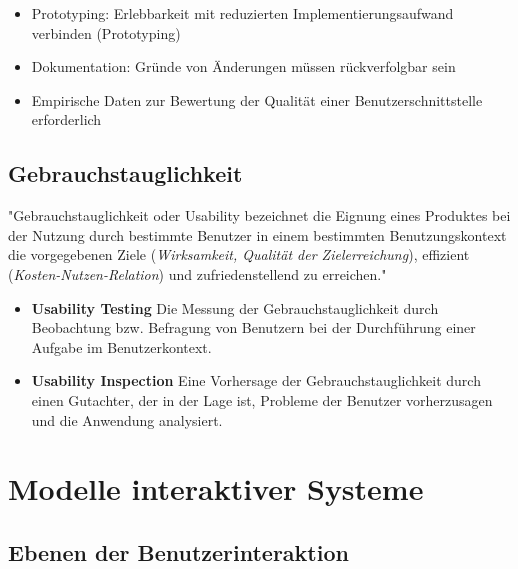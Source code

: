 \documentclass
[
	8pt,		%
	ngerman,	%
	a4paper,	%
	landscape,	%
	final		%
]{extarticle}
\begin{document}
\begin{multicols*}{4}
\begin{itemize}
\begin{itemize}[nolistsep]
\begin{itemize}[nolistsep]
				            \item Prototyping: Erlebbarkeit mit reduzierten
				                  Implementierungsaufwand verbinden (Prototyping)
				            \item Dokumentation: Gründe von Änderungen müssen
				                  rückverfolgbar sein
			            \end{itemize}
		      \end{itemize}
		      \begin{itemize}[nolistsep]
			      \item Empirische Daten zur Bewertung der Qualität einer
			            Benutzerschnittstelle erforderlich
		      \end{itemize}
	\end{itemize}
	\subsection{Gebrauchstauglichkeit}
	"Gebrauchstauglichkeit oder Usability bezeichnet die Eignung eines Produktes
	bei der Nutzung durch bestimmte Benutzer in einem bestimmten
	Benutzungskontext die vorgegebenen Ziele
	(\textit{Wirksamkeit, Qualität der Zielerreichung}), effizient
	(\textit{Kosten-Nutzen-Relation}) und zufriedenstellend zu erreichen."
	\begin{itemize}
		\item \textbf{Usability Testing} Die Messung der Gebrauchstauglichkeit
		      durch Beobachtung bzw. Befragung von Benutzern  bei der
		      Durchführung einer Aufgabe im Benutzerkontext.
		\item \textbf{Usability Inspection} Eine Vorhersage der
		      Gebrauchstauglichkeit durch einen Gutachter, der in der Lage ist,
		      Probleme der Benutzer vorherzusagen und die Anwendung analysiert.
	\end{itemize}
	\section{Modelle interaktiver Systeme}
	\subsection{Ebenen der Benutzerinteraktion}
	{
		\setlength{\columnseprule}{0pt}
		\begin{multicols*}{2}

\end{multicols*}}
\end{multicols*}
\end{document}
